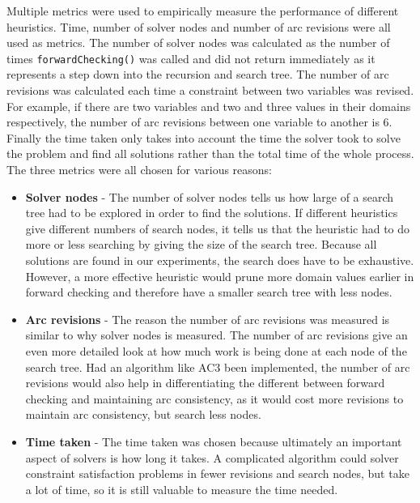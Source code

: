 \documentclass{article}
\begin{document}
Multiple metrics were used to empirically measure the performance of different heuristics. Time, number of solver nodes and number of arc revisions were all used as metrics. The number of solver nodes was calculated as the number of times \texttt{forwardChecking()} was called and did not return immediately as it represents a step down into the recursion and search tree. The number of arc revisions was calculated each time a constraint between two variables was revised. For example, if there are two variables and two and three values in their domains respectively, the number of arc revisions between one variable to another is 6. Finally the time taken only takes into account the time the solver took to solve the problem and find all solutions rather than the total time of the whole process. 
\n
The three metrics were all chosen for various reasons:
\begin{itemize}
\item \textbf{Solver nodes} - The number of solver nodes tells us how large of a search tree had to be explored in order to find the solutions. If different heuristics give different numbers of search nodes, it tells us that the heuristic had to do more or less searching by giving the size of the search tree. Because all solutions are found in our experiments, the search does have to be exhaustive. However, a more effective heuristic would prune more domain values earlier in forward checking and therefore have a smaller search tree with less nodes. 
\item \textbf{Arc revisions} - The reason the number of arc revisions was measured is similar to why solver nodes is  measured. The number of arc revisions give an even more detailed look at how much work is being done at each node of the search tree. Had an algorithm like AC3 been implemented, the number of arc revisions would also help in differentiating the different between forward checking and maintaining arc consistency, as it would cost more revisions to maintain arc consistency, but search less nodes. 
\item \textbf{Time taken} - The time taken was chosen because ultimately an important aspect of solvers is how long it takes. A complicated algorithm could solver constraint satisfaction problems in fewer revisions and search nodes, but take a lot of time, so it is still valuable to measure the time needed. 
\end{itemize}
\end{document}
